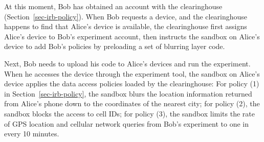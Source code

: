 At this moment,  Bob has obtained an account with the clearinghouse 
(Section~\ref{sec-irb-policy}).
When Bob requests a device, and the clearinghouse
happens to find that Alice's device is available, the
clearinghouse first 
assigns Alice's device to Bob's experiment account, then instructs 
the sandbox on Alice's device to add Bob's policies by preloading
a set of blurring layer code.

Next, Bob needs to upload his code to Alice's devices and 
run the experiment. When he accesses the device through
the experiment tool, the sandbox on Alice's device 
applies the data access policies loaded by the clearinghouse: For policy (1) in
Section~\ref{sec-irb-policy}, the sandbox blurs the location
information returned from Alice's phone down to the coordinates
of the nearest city; for policy (2), the sandbox blocks the
access to cell IDs; for policy (3), the sandbox limits the rate
of GPS location and cellular network queries from Bob's
experiment to one in every 10 minutes.

